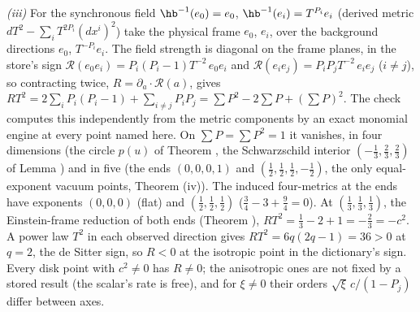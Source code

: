 \emph{(iii)} For the synchronous field $\hb^{-1}(e_{0}) = e_{0}$, $\hb^{-1}(e_{i}) = T^{P_{i}}e_{i}$ (derived metric $dT^{2} - \sum_{i}T^{2P_{i}}(dx^{i})^{2}$) take the physical frame $e_{0}$, $e_{i}$, over the background directions $e_{0}$, $T^{-P_{i}}e_{i}$. The field strength is diagonal on the frame planes, in the store's sign $\mathcal{R}(e_{0}e_{i}) = P_{i}(P_{i} - 1)T^{-2}\,e_{0}e_{i}$ and $\mathcal{R}(e_{i}e_{j}) = P_{i}P_{j}T^{-2}\,e_{i}e_{j}$ ($i \neq j$), so contracting twice, $R = \partial_{a}\cdot\mathcal{R}(a)$, gives $RT^{2} = 2\sum_{i}P_{i}(P_{i} - 1) + \sum_{i \neq j}P_{i}P_{j} = \sum P^{2} - 2\sum P + (\sum P)^{2}$. The check computes this independently from the metric components by an exact monomial engine at every point named here. On $\sum P = \sum P^{2} = 1$ it vanishes, in four dimensions (the circle $p(u)$ of Theorem , the Schwarzschild interior $(-\tfrac13, \tfrac23, \tfrac23)$ of Lemma ) and in five (the ends $(0, 0, 0, 1)$ and $(\tfrac12, \tfrac12, \tfrac12, -\tfrac12)$, the only equal-exponent vacuum points, Theorem (iv)). The induced four-metrics at the ends have exponents $(0, 0, 0)$ (flat) and $(\tfrac12, \tfrac12, \tfrac12)$ ($\tfrac34 - 3 + \tfrac94 = 0$). At $(\tfrac13, \tfrac13, \tfrac13)$, the Einstein-frame reduction of both ends (Theorem ), $RT^{2} = \tfrac13 - 2 + 1 = -\tfrac23 = -c^{2}$. A power law $T^{2}$ in each observed direction gives $RT^{2} = 6q(2q - 1) = 36 > 0$ at $q = 2$, the de Sitter sign, so $R < 0$ at the isotropic point in the dictionary's sign. Every disk point with $c^{2} \neq 0$ has $R \neq 0$; the anisotropic ones are not fixed by a stored result (the scalar's rate is free), and for $\xi \neq 0$ their orders $\sqrt{\xi}\,c/(1 - P_{j})$ differ between axes.


